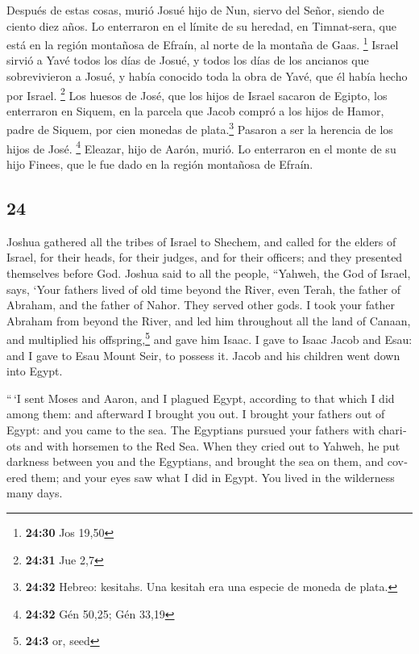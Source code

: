 \begin{paracol}{2}
 Después de estas cosas, murió Josué hijo de Nun, siervo
del Señor, siendo de ciento diez años.  Lo enterraron en
el límite de su heredad, en Timnat-sera, que está en la región montañosa
de Efraín, al norte de la montaña de Gaas. \footnote{\textbf{24:30} Jos
  19,50}  Israel sirvió a Yavé todos los días de Josué, y
todos los días de los ancianos que sobrevivieron a Josué, y había
conocido toda la obra de Yavé, que él había hecho por Israel.
\footnote{\textbf{24:31} Jue 2,7}  Los huesos de José,
que los hijos de Israel sacaron de Egipto, los enterraron en Siquem, en
la parcela que Jacob compró a los hijos de Hamor, padre de Siquem, por
cien monedas de plata.\footnote{\textbf{24:32} Hebreo: kesitahs. Una
  kesitah era una especie de moneda de plata.} Pasaron a ser la herencia
de los hijos de José. \footnote{\textbf{24:32} Gén 50,25; Gén 33,19}
 Eleazar, hijo de Aarón, murió. Lo enterraron en el monte
de su hijo Finees, que le fue dado en la región montañosa de Efraín.
\switchcolumn \begin{otherlanguage}{english}

\hypertarget{section-47}{%
\section{24}\label{section-47}}

 Joshua gathered all the tribes of Israel to Shechem, and
called for the elders of Israel, for their heads, for their judges, and
for their officers; and they presented themselves before God.
 Joshua said to all the people, ``Yahweh, the God of
Israel, says, `Your fathers lived of old time beyond the River, even
Terah, the father of Abraham, and the father of Nahor. They served other
gods.  I took your father Abraham from beyond the River,
and led him throughout all the land of Canaan, and multiplied his
offspring,\footnote{\textbf{24:3} or, seed} and gave him Isaac.
 I gave to Isaac Jacob and Esau: and I gave to Esau Mount
Seir, to possess it. Jacob and his children went down into Egypt.

 ``\,`I sent Moses and Aaron, and I plagued Egypt,
according to that which I did among them: and afterward I brought you
out.  I brought your fathers out of Egypt: and you came to
the sea. The Egyptians pursued your fathers with chariots and with
horsemen to the Red Sea.  When they cried out to Yahweh,
he put darkness between you and the Egyptians, and brought the sea on
them, and covered them; and your eyes saw what I did in Egypt. You lived
in the wilderness many days.


\end{otherlanguage}
\end{paracol}
